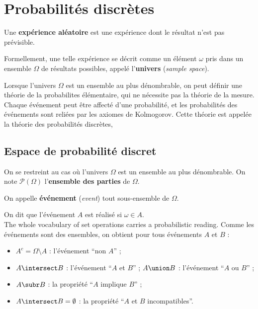 \section{Probabilités discrètes}

\begin{definition}
  Une \textbf{expérience aléatoire} est une expérience dont le résultat n'est pas
  prévisible.
\end{definition}
Formellement, une telle expérience se décrit comme un élément $\omega$ pris
dans un ensemble $\Omega$ de résultats possibles, appelé l'\textbf{univers}
(\textit{sample space}).

Lorsque l'univers $\Omega$ est un ensemble au plus dénombrable, on peut définir
une théorie de la probabilites élémentaire, qui ne nécessite pas la théorie de
la mesure.  Chaque événement peut être affecté d'une probabilité, et les
probabilités des événements sont reliées par les axiomes de Kolmogorov. Cette
théorie est appelée la théorie des probabilités discrètes,

\subsection{Espace de probabilité discret}

On se restreint au cas où l'univers $\Omega$ est un ensemble au plus
dénombrable. On note $\mathcal{P}(\Omega)$ l'\textbf{ensemble des parties} de
$\Omega$.

\begin{definition}[Événement]
  On appelle \textbf{événement} (\textit{event}) tout sous-ensemble de $\Omega$.
\end{definition}

On dit que l'événement $A$ est réalisé si $\omega \in A$.\\

The whole vocabulary of set operations carries a probabilistic reading. Comme
les événements sont des ensembles, on obtient pour tous événements $A$ et $B$ :

\begin{itemize}
  \item $A^{c} = \Omega \setminus A$ : l'événement ``non $A$'' ;
  \item $A \intersect B$ : l'événement ``$A$ et $B$'' ; $A \union B$ :
    l'événement ``$A$ ou $B$'' ;
  \item $A \subr B$ : la propriété ``$A$ implique $B$'' ;
  \item $A \intersect B = \emptyset$ : la propriété ``$A$ et $B$ incompatibles''.
\end{itemize}

